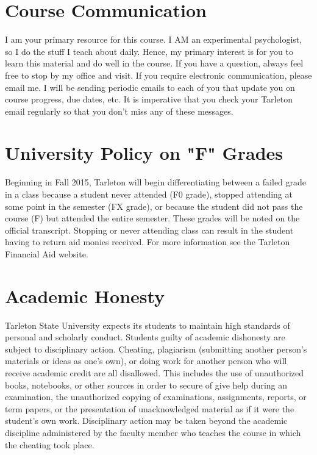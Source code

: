 \documentclass[10pt]{article}
\begin{document}
\section*{Course Communication}
\label{sec-6}

I am your primary resource for this course. I AM an experimental psychologist, so I do the stuff I teach about daily. Hence, my primary interest is for you to learn this material and do well in the course. If you have a question, always feel free to stop by my office and visit.  If you require electronic communication, please email me.  I will be sending periodic emails to each of you that update you on course progress, due dates, etc.  It is imperative that you check your Tarleton email regularly so that you don't miss any of these messages.

\section*{University Policy on "F" Grades}
\label{sec-7}
Beginning in Fall 2015, Tarleton will begin differentiating between a failed grade in a class because a student never attended (F0 grade), stopped attending at some point in the semester (FX grade), or because the student did not pass the course (F) but attended the entire semester. These grades will be noted on the official transcript. Stopping or never attending class can result in the student having to return aid monies received.  For more information see the Tarleton Financial Aid website.

\section*{Academic Honesty}
\label{sec-8}

Tarleton State University expects its students to maintain high standards of personal and scholarly conduct. Students guilty of academic dishonesty are subject to disciplinary action. Cheating, plagiarism (submitting another person’s materials or ideas as one’s own), or doing work for another person who will receive academic credit are all disallowed. This includes the use of unauthorized books, notebooks, or other sources in order to secure of give help during an examination, the unauthorized copying of examinations, assignments, reports, or term papers, or the presentation of unacknowledged material as if it were the student’s own work. Disciplinary action may be taken beyond the academic discipline administered by the faculty member who teaches the course in which the cheating took place.
\end{document}
